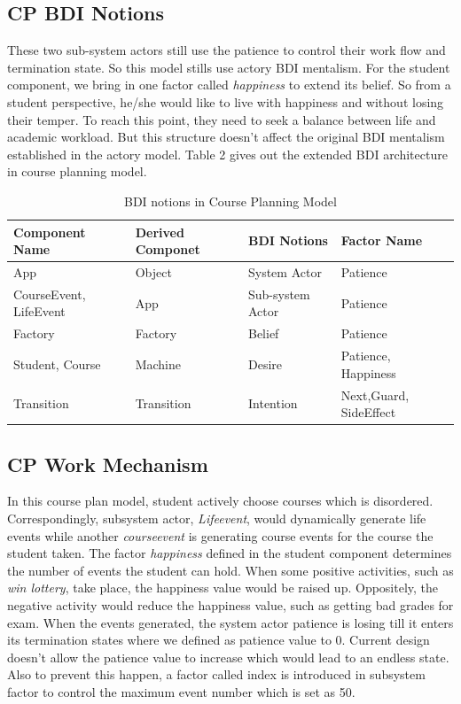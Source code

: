 \documentclass{sig-alternate}
\begin{document}
\subsection{CP BDI Notions}
These two sub-system actors still use the patience to control their work flow and termination state.  So this model stills use actory BDI mentalism.  For the student component, we bring in one factor called {\em happiness} to extend its belief.  So from a student perspective, he/she would like to live with happiness and without losing their temper.  To reach this point, they need to seek a balance between life and academic workload.   But this structure doesn't affect the original BDI mentalism established in the actory model. Table 2 gives out the extended BDI architecture in course planning model.\\
\begin{table}
\centering
\caption{BDI notions in Course Planning Model}
\begin{tabular}{|l|l|l|l|}\hline
Component Name & Derived Componet & BDI Notions & Factor Name \\
\hline
App & Object & System Actor & Patience\\
\hline
CourseEvent, LifeEvent & App & Sub-system Actor & Patience\\
\hline
Factory & Factory  & Belief & Patience\\
\hline
Student, Course & Machine & Desire & Patience, Happiness \\
\hline
Transition& Transition & Intention & Next,Guard, SideEffect \\
\hline

\end{tabular}
\end{table}

\subsection{CP Work Mechanism}
In this course plan model, student actively choose courses which is disordered.  Correspondingly, subsystem actor, {\em Lifeevent}, would dynamically generate life events while another {\em courseevent} is generating course events for the course the student taken.  The factor {\em happiness} defined in the student component determines the number of events the student can hold.  When some positive activities, such as {\em win lottery}, take place, the happiness value would be raised up.  Oppositely, the negative activity would reduce the happiness value, such as getting bad grades for exam.  When the events generated, the system actor patience is losing till it enters its termination states where we defined as patience value to 0. Current design doesn't allow the patience value to increase which would lead to an endless state. Also to prevent this happen, a factor called index is introduced in subsystem factor to control the maximum event number which is set as 50.\\
\end{document}
